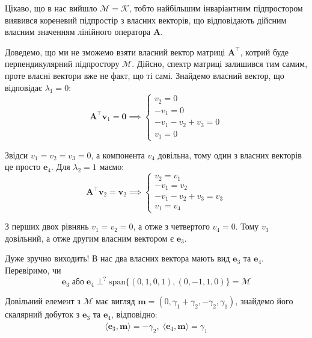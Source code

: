 \documentclass[oneside,solution]{karazin-control-assign}
\begin{document}
Цікаво, що в нас вийшло $\mathcal{M} = \mathcal{K}$, тобто найбільшим інваріантним підпростором виявився кореневий підпростір з власних векторів, що відповідають дійсним власним значенням лінійного оператора $\boldsymbol{A}$. 

Доведемо, що ми не зможемо взяти власний вектор матриці $\boldsymbol{A}^{\top}$, котрий буде перпендикулярний підпростору $\mathcal{M}$. Дійсно, спектр матриці залишився тим самим, проте власні вектори вже не факт, що ті самі. Знайдемо власний вектор, що відповідає $\lambda_1=0$:
\begin{equation}
    \boldsymbol{A}^{\top}\mathbf{v}_1 = \mathbf{0} \implies \begin{cases}
        v_2 = 0 \\
        -v_1 = 0 \\
        -v_1 - v_2 + v_3 = 0\\
        v_1 = 0
    \end{cases}
\end{equation}

Звідси $v_1=v_2=v_3=0$, а компонента $v_4$ довільна, тому один з власних векторів це просто $\mathbf{e}_4$. Для $\lambda_2=1$ маємо:
\begin{equation}
    \boldsymbol{A}^{\top}\mathbf{v}_2 = \mathbf{v}_2 \implies \begin{cases}
        v_2 = v_1 \\
        -v_1 = v_2 \\
        -v_1-v_2+v_3 = v_3 \\
        v_1 = v_4
    \end{cases}
\end{equation}

З перших двох рівнянь $v_1=v_2=0$, а отже з четвертого $v_4=0$. Тому $v_3$ довільний, а отже другим власним вектором є $\mathbf{e}_3$. 

Дуже зручно виходить! В нас два власних вектора мають вид $\mathbf{e}_3$ та $\mathbf{e}_4$. Перевіримо, чи
\begin{equation}
    \mathbf{e}_3 \; \text{або} \; \mathbf{e}_4 \perp^? \text{span}\{(0,1,0,1),(0,-1,1,0)\} = \mathcal{M}
\end{equation}

Довільний елемент з $\mathcal{M}$ має вигляд $\mathbf{m}=(0,\gamma_1+\gamma_2,-\gamma_2,\gamma_1)$, знайдемо його скалярний добуток з $\mathbf{e}_3$ та $\mathbf{e}_4$, відповідно:
\begin{gather}
    \langle \mathbf{e}_3, \mathbf{m} \rangle = -\gamma_2, \; \langle \mathbf{e}_4, \mathbf{m} \rangle = \gamma_1
\end{gather}
\end{document}
